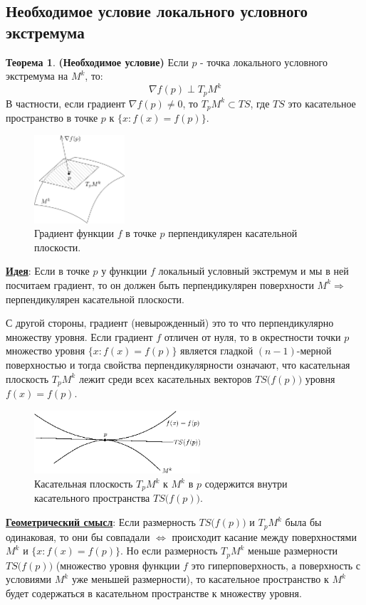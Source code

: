 \documentclass[12pt]{article}
\theoremstyle{definition}
\newtheorem{theorem}{Теорема}
\begin{document}
\subsection*{Необходимое условие локального условного экстремума}
\begin{theorem}\textbf{(Необходимое условие)}
	Если $p$ - точка локального условного экстремума на $M^k$, то: 
	$$
		\nabla f(p) \perp T_p M^k
	$$
	В частности, если градиент $\nabla f(p) \neq 0$, то $T_p M^k \subset TS$, где $TS$ это  касательное пространство в точке $p$ к $\{x \colon f(x) = f(p)\}$.
\end{theorem}
\begin{figure}[H]
	\centering
	\includegraphics[width=0.3\textwidth]{20_1.png}
	\caption{Градиент функции $f$ в точке $p$ перпендикулярен касательной плоскости.}
	\label{20_1}
\end{figure}
\textbf{\uline{Идея}}: Если в точке $p$  у функции $f$ локальный условный экстремум и мы в ней посчитаем градиент, то он должен быть перпендикулярен поверхности $M^k \Rightarrow$ перпендикулярен касательной плоскости. 

С другой стороны, градиент (невырожденный) это то что перпендикулярно множеству уровня. Если градиент $f$ отличен от нуля, то в окрестности точки $p$ множество уровня $\{x \colon f(x) = f(p)\}$ является гладкой $(n-1)$-мерной поверхностью и тогда свойства перпендикулярности означают, что касательная плоскость $T_p M^k$ лежит среди всех касательных векторов $TS\big(f(p)\big)$ уровня $f(x) = f(p)$.
\begin{figure}[H]
	\centering
	\includegraphics[width=0.55\textwidth]{20_2.eps}
	\caption{Касательная плоскость $T_p M^k$ к $M^k$ в $p$ содержится внутри касательного пространства $TS\big(f(p)\big)$.}
	\label{20_2}
\end{figure}
\textbf{\uline{Геометрический смысл}}: Если размерность $TS\big(f(p)\big)$ и $T_p M^k$ была бы одинаковая, то они бы совпадали $\Leftrightarrow$ происходит касание между поверхностями $M^k$ и $\{x \colon f(x) = f(p)\}$. Но если размерность $T_p M^k$ меньше размерности $TS\big(f(p)\big)$ (множество уровня функции $f$ это гиперповерхность, а  поверхность с условиями $M^k$ уже меньшей размерности), то касательное пространство к $M^k$ будет содержаться в касательном пространстве к множеству уровня.
\end{document}
